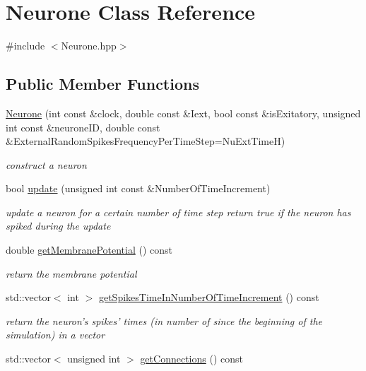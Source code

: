 \hypertarget{classNeurone}{\section{Neurone Class Reference}
\label{classNeurone}
}


{\ttfamily \#include $<$Neurone.\-hpp$>$}

\subsection*{Public Member Functions}
\begin{DoxyCompactItemize}
\item 
\hyperlink{classNeurone_a7908c3fab353efd2d2cf2e96f4a18255}{Neurone} (int const \&clock, double const \&Iext, bool const \&is\-Exitatory, unsigned int const \&neurone\-I\-D, double const \&External\-Random\-Spikes\-Frequency\-Per\-Time\-Step=Nu\-Ext\-Time\-H)
\begin{DoxyCompactList}\small\item\em construct a neuron \end{DoxyCompactList}\item 
bool \hyperlink{classNeurone_aa6dac345fd1ab43f5aa92034c64abec8}{update} (unsigned int const \&Number\-Of\-Time\-Increment)
\begin{DoxyCompactList}\small\item\em update a neuron for a certain number of time step return true if the neuron has spiked during the update \end{DoxyCompactList}\item 
\hypertarget{classNeurone_a47461fff747136e1569184fe5ebcd4c9}{double \hyperlink{classNeurone_a47461fff747136e1569184fe5ebcd4c9}{get\-Membrane\-Potential} () const }\label{classNeurone_a47461fff747136e1569184fe5ebcd4c9}

\begin{DoxyCompactList}\small\item\em return the membrane potential \end{DoxyCompactList}\item 
\hypertarget{classNeurone_a99d7af7ba00e6ad898330d15b38832db}{std\-::vector$<$ int $>$ \hyperlink{classNeurone_a99d7af7ba00e6ad898330d15b38832db}{get\-Spikes\-Time\-In\-Number\-Of\-Time\-Increment} () const }\label{classNeurone_a99d7af7ba00e6ad898330d15b38832db}

\begin{DoxyCompactList}\small\item\em return the neuron's spikes' times (in number of since the beginning of the simulation) in a vector \end{DoxyCompactList}\item 
\hypertarget{classNeurone_ababb4cebec2f4437587ec8576e1b9f8c}{std\-::vector$<$ unsigned int $>$ \hyperlink{classNeurone_ababb4cebec2f4437587ec8576e1b9f8c}{get\-Connections} () const }\label{classNeurone_ababb4cebec2f4437587ec8576e1b9f8c}


\end{DoxyCompactItemize}
